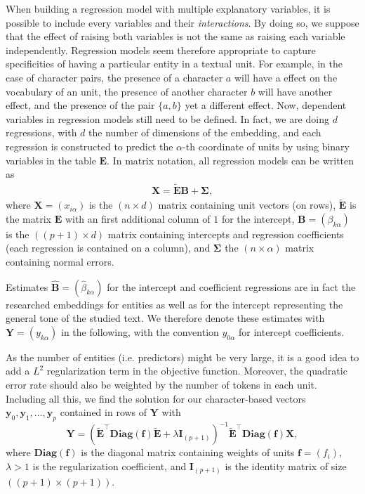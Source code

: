\documentclass[
twocolumn,
]{ceurart}
\begin{document}
When building a regression model with multiple explanatory variables, it is possible to include every variables and their \emph{interactions}. By doing so, we suppose that the effect of raising both variables is not the same as raising each variable independently. Regression models seem therefore appropriate to capture specificities of having a particular entity in a textual unit. For example, in the case of character pairs, the presence of a character $a$ will have a effect on the vocabulary of an unit, the presence of another character $b$ will have another effect, and the presence of the pair $\{a, b\}$ yet a different effect. Now, dependent variables in regression models still need to be defined. In fact, we are doing $d$ regressions, with $d$ the number of dimensions of the embedding, and each regression is constructed to predict the $\alpha$-th coordinate of units by using binary variables in the table $\mathbf{E}$. In matrix notation, all regression models can be written as
\begin{align}
\mathbf{X} = \widetilde{\mathbf{E}} \mathbf{B} + \bm{\Sigma}, \label{cent_sol}
\end{align}
where $\mathbf{X} = (x_{i\alpha})$ is the $(n \times d)$ matrix containing unit vectors (on rows), $\widetilde{\mathbf{E}}$ is the matrix $\mathbf{E}$ with an first additional column of $1$ for the intercept, $\mathbf{B} = (\beta_{k\alpha})$ is the $((p+1) \times d)$ matrix containing intercepts and regression coefficients (each regression is contained on a column), and $\mathbf{\Sigma}$ the $(n \times \alpha)$ matrix containing normal errors. 

Estimates $\widehat{\mathbf{B}} = (\widehat{\beta}_{k\alpha})$ for the intercept and coefficient regressions are in fact the researched embeddings for entities as well as for the intercept representing the general tone of the studied text. We therefore denote these estimates with $\mathbf{Y} = (y_{k\alpha})$ in the following, with the convention $y_{0\alpha}$ for intercept coefficients. 

As the number of entities (i.e. predictors) might be very large, it is a good idea to add a $L^2$ regularization term in the objective function. Moreover, the quadratic error rate should also be weighted by the number of tokens in each unit. Including all this, we find the solution for our character-based vectors $\mathbf{y}_0, \mathbf{y}_1, \ldots, \mathbf{y}_p$ contained in rows of $\mathbf{Y}$ with 
\begin{equation}
\mathbf{Y} = (\widetilde{\mathbf{E}}^\top \textbf{Diag}(\mathbf{f}) \widetilde{\mathbf{E}} + \lambda \mathbf{I}_{(p+1)})^{-1} \widetilde{\mathbf{E}}^\top \textbf{Diag}(\mathbf{f}) \mathbf{X}, \label{reg_sol}
\end{equation}
where $\textbf{Diag}(\mathbf{f})$ is the diagonal matrix containing weights of units $\mathbf{f} = \left( f_i \right)$, $\lambda > 1$ is the regularization coefficient, and $\mathbf{I}_{(p+1)}$ is the identity matrix of size $((p+1) \times (p+1))$.
\end{document}
